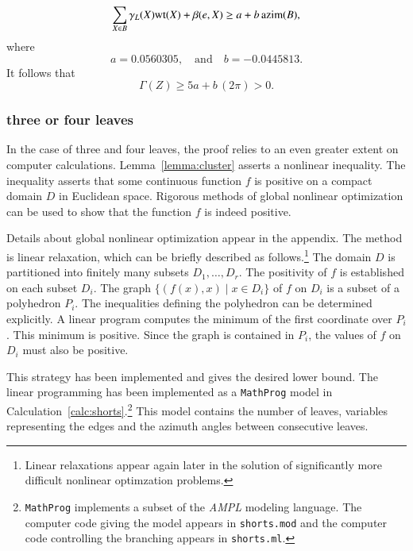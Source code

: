 \begin{displaymath}
\sum_{X\in B} \gamma_L(X){\operatorname{wt}}(X) + \beta(e,X) \ge a + b\,{\operatorname{azim}}(B),
\end{displaymath}
where
\begin{displaymath}
a= 0.0560305, \quad\text{and}\quad  b= -0.0445813.
\end{displaymath}
It follows that
\begin{displaymath}
\Gamma(Z) \ge 5 a + b\, (2\pi) > 0.
\end{displaymath}

\subsubsection{three or four leaves}\label{sec:3or4}

In the case of three and four leaves, the proof relies to an even
greater extent on computer calculations.  
Lemma~\ref{lemma:cluster} asserts a nonlinear inequality.  The inequality
asserts that some continuous function $f$ is positive on a compact
domain $D$ in Euclidean space.  Rigorous methods of global nonlinear
optimization can be used to show that the function $f$ is indeed
positive.

Details about global nonlinear optimization appear in the appendix.
The method is linear relaxation, which can be briefly described as
follows.\footnote{Linear relaxations appear again later in the
solution of significantly more difficult nonlinear optimzation
problems.}  The domain $D$ is partitioned into finitely many subsets
$D_1,\ldots, D_r$.  The positivity of $f$ is established on each
subset $D_i$.  The graph $\{(f(x), x)\mid x\in D_i\}$ of $f$ on $D_i$
is a subset of a polyhedron $P_i$.  The inequalities defining the
polyhedron can be determined explicitly.  A linear program computes
the minimum of the first coordinate over $P_i$.  This minimum is
positive.  Since the graph is contained in $P_i$, the values of $f$ on
$D_i$ must also be positive.

This strategy has been implemented and gives the desired lower bound.
The linear programming has been implemented as a {\tt MathProg} model
in Calculation~\ref{calc:shorts}.\footnote{{\tt MathProg} implements a
subset of the {\it AMPL} modeling language.  The computer code
giving the model appears in {\tt shorts.mod} and the computer code
controlling the branching appears in {\tt shorts.ml}.}  This model
contains the number of leaves, variables representing the edges and
the azimuth angles between consecutive leaves.

